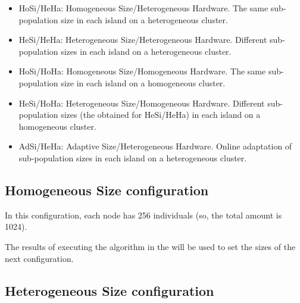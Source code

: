 \begin{itemize}
\item HoSi/HeHa: Homogeneous Size/Heterogeneous Hardware. The same sub-population size in each island on a heterogeneous cluster.
\item HeSi/HeHa: Heterogeneous Size/Heterogeneous Hardware. Different
  sub-population sizes in each island on a heterogeneous cluster. %
\item HoSi/HoHa: Homogeneous Size/Homogeneous Hardware. The same
  sub-population size in each island on a homogeneous cluster. %
\item HeSi/HoHa: Heterogeneous Size/Homogeneous Hardware. Different sub-population sizes (the obtained for HeSi/HeHa) in each island on a homogeneous cluster.

\item AdSi/HeHa: Adaptive Size/Heterogeneous Hardware. Online adaptation of sub-population sizes in each island on a heterogeneous cluster.
\end{itemize} %



\subsection{Homogeneous Size configuration}

In this configuration, each node has 256 individuals (so, the total
amount is 1024).  %

The results of executing the algorithm in the will be used to set the sizes of the next configuration.






\subsection{Heterogeneous Size configuration}

